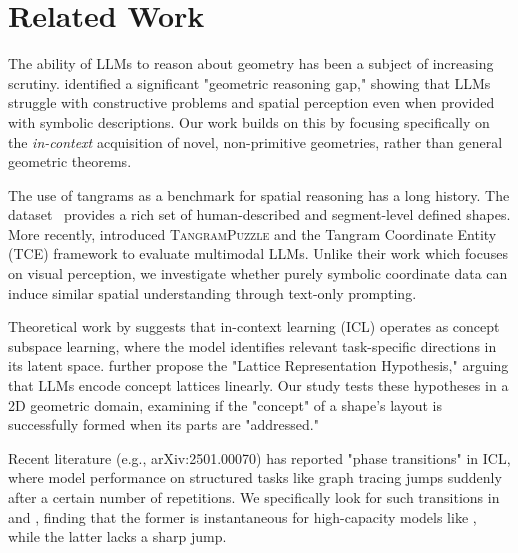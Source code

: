 \section{Related Work}
\label{sec:related}

The ability of LLMs to reason about geometry has been a subject of increasing scrutiny. \citet{mouselinos2024beyond} identified a significant "geometric reasoning gap," showing that LLMs struggle with constructive problems and spatial perception even when provided with symbolic descriptions. Our work builds on this by focusing specifically on the \textit{in-context} acquisition of novel, non-primitive geometries, rather than general geometric theorems.

The use of tangrams as a benchmark for spatial reasoning has a long history. The \kilogram dataset~\cite{ji2022kilogram} provides a rich set of human-described and segment-level defined shapes. More recently, \citet{liu2026tangrampuzzle} introduced \textsc{TangramPuzzle} and the Tangram Coordinate Entity (\textsc{TCE}) framework to evaluate multimodal LLMs. Unlike their work which focuses on visual perception, we investigate whether purely symbolic coordinate data can induce similar spatial understanding through text-only prompting.

Theoretical work by \citet{tang2026concept} suggests that in-context learning (ICL) operates as concept subspace learning, where the model identifies relevant task-specific directions in its latent space. \citet{xiong2026lattice} further propose the "Lattice Representation Hypothesis," arguing that LLMs encode concept lattices linearly. Our study tests these hypotheses in a 2D geometric domain, examining if the "concept" of a shape's layout is successfully formed when its parts are "addressed."

Recent literature (e.g., arXiv:2501.00070) has reported "phase transitions" in ICL, where model performance on structured tasks like graph tracing jumps suddenly after a certain number of repetitions. We specifically look for such transitions in \addressing and \reasoning, finding that the former is instantaneous for high-capacity models like \gpt, while the latter lacks a sharp jump.
